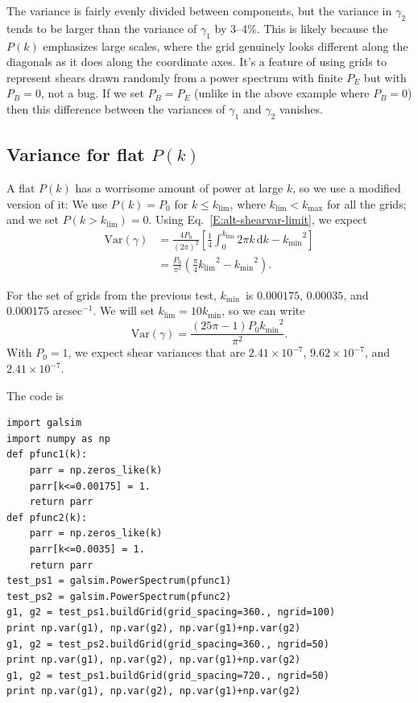 \documentclass[preprint]{aastex}
\newcommand{\klim}{\ensuremath{k_\mathrm{lim}}}
\newcommand{\kmax}{\ensuremath{k_\mathrm{max}}}
\newcommand{\kmin}{\ensuremath{k_\mathrm{min}}}
\newcommand{\rmd}{\ensuremath{\mathrm{d}}}
\newcommand{\beq}{\begin{equation}}
\newcommand{\eeq}{\end{equation}}
\begin{document}
The variance is fairly evenly divided between components, but the
variance in $\gamma_2$ tends to be larger than the variance of
$\gamma_1$ by 3--4\%.  This is
likely because the $P(k)$ emphasizes large scales, where the grid
genuinely looks different along the diagonals as it does along the
coordinate axes.  It's a feature of using grids to represent shears
drawn randomly from a power spectrum with finite $P_E$ but with
$P_B=0$, not a bug. If we set $P_B=P_E$ (unlike in the above example 
where $P_B=0$) then this difference between the variances of
$\gamma_1$ and $\gamma_2$ vanishes.

\subsection{Variance for flat $P(k)$}

A flat $P(k)$ has a worrisome amount of power at large $k$, so we use
a modified version of it: We use $P(k)=P_0$ for $k\le$\klim, where
$\klim<\kmax$ for all the grids; and we set $P(k>\klim)=0$. Using
Eq.~\eqref{E:alt-shearvar-limit}, we expect
\begin{align}
\mathrm{Var}(\gamma) &= \frac{4P_0}{(2\pi)^2}
\left[\frac{1}{4}\int_{0}^{\klim} 2\pi k\,\rmd k - \kmin^2\right] \\
 &= \frac{P_0}{\pi^2} \left(\frac{\pi}{4} \klim^2 - \kmin^2\right).
\end{align}

For the set of grids from the previous test, \kmin\ is
$0.000175$, $0.00035$, and $0.000175$ arcsec$^{-1}$.  We will set $\klim=10\kmin$,
so we can write
\beq
\mathrm{Var}(\gamma) = \frac{(25\pi-1) P_0 \kmin^2}{\pi^2}.
\eeq
With $P_0=1$, we expect
shear variances that are $2.41\times 10^{-7}$, $9.62\times 10^{-7}$,
and $2.41\times 10^{-7}$.

The code is
\begin{verbatim}
import galsim
import numpy as np
def pfunc1(k):
    parr = np.zeros_like(k)
    parr[k<=0.00175] = 1.
    return parr
def pfunc2(k):
    parr = np.zeros_like(k)
    parr[k<=0.0035] = 1.
    return parr
test_ps1 = galsim.PowerSpectrum(pfunc1)
test_ps2 = galsim.PowerSpectrum(pfunc2)
g1, g2 = test_ps1.buildGrid(grid_spacing=360., ngrid=100)
print np.var(g1), np.var(g2), np.var(g1)+np.var(g2)
g1, g2 = test_ps2.buildGrid(grid_spacing=360., ngrid=50)
print np.var(g1), np.var(g2), np.var(g1)+np.var(g2)
g1, g2 = test_ps1.buildGrid(grid_spacing=720., ngrid=50)
print np.var(g1), np.var(g2), np.var(g1)+np.var(g2)
\end{verbatim}
\end{document}
